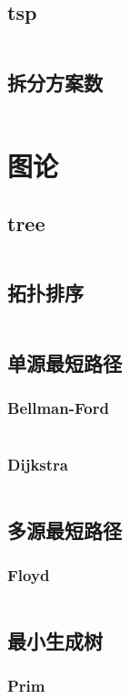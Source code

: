 \documentclass[a4paper,11pt]{article}
\begin{document}
\subsection{tsp}
\inputminted[breaklines]{c++}{dp/tsp.cpp}
\subsection{拆分方案数}
\inputminted[breaklines]{c++}{dp/split_scheme.cpp}

\section{图论}
\subsection{tree}
\inputminted[breaklines]{c++}{graph/tree.h}
\subsection{拓扑排序}
\inputminted[breaklines]{c++}{graph/topoord.cpp}
\subsection{单源最短路径}
\subsubsection{Bellman-Ford}
\inputminted[breaklines]{c++}{graph/bellman.cpp}
\subsubsection{Dijkstra}
\inputminted[breaklines]{c++}{graph/dijkstra.cpp}

\subsection{多源最短路径}
\subsubsection{Floyd}
\inputminted[breaklines]{c++}{graph/floyd.cpp}

\subsection{最小生成树} 
\subsubsection{Prim} 
\inputminted[breaklines]{c++}{graph/prim.cpp}
\end{document}
